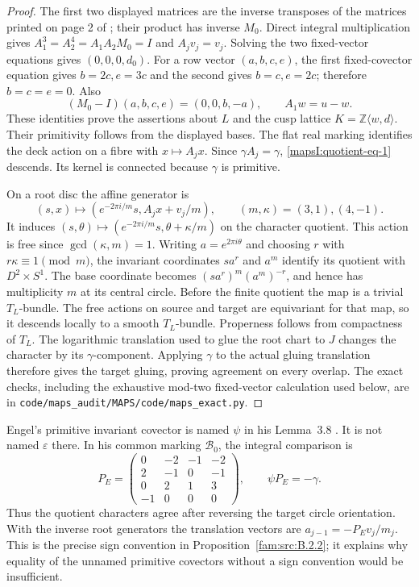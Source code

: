 \begin{proof}
The first two displayed matrices are the inverse transposes of
the matrices printed on page 2 of \cite{AC2026}; their product
has inverse $M_0$.  Direct integral multiplication gives
$A_1^3=A_2^4=A_1A_2M_0=I$ and $A_jv_j=v_j$.
Solving the two fixed-vector equations gives $(0,0,0,d_0)$.
For a row vector $(a,b,c,e)$, the first fixed-covector equation
gives $b=2c,e=3c$ and the second gives $b=c,e=2c$;
therefore $b=c=e=0$.  Also
\[
 (M_0-I)(a,b,c,e)=(0,0,b,-a),\qquad
 A_1w=u-w.
\]
These identities prove the assertions about $L$ and the cusp
lattice $K=\mathbb Z\langle w,d\rangle$.  Their primitivity follows
from the displayed bases.  The flat real marking identifies the
deck action on a fibre with $x\mapsto A_jx$.  Since
$\gamma A_j=\gamma$, \eqref{mapsI:quotient-eq-1} descends.  Its kernel is connected
because $\gamma$ is primitive.

On a root disc the affine generator is
\[
 (s,x)\longmapsto
 (e^{-2\pi i/m}s,A_jx+v_j/m),\qquad (m,\kappa)=(3,1),(4,-1).
\]
It induces $(s,\theta)\mapsto
(e^{-2\pi i/m}s,\theta+\kappa/m)$ on the character quotient.
This action is free since $\gcd(\kappa,m)=1$.  Writing
$a=e^{2\pi i\theta}$ and choosing $r$ with $r\kappa\equiv1\pmod m$,
the invariant coordinates $s a^r$ and $a^m$ identify its quotient
with $D^2\times S^1$.  The base coordinate becomes
$(s a^r)^m(a^m)^{-r}$, and hence has multiplicity $m$ at its
central circle.  Before the finite quotient the map is a trivial
$T_L$-bundle.  The free actions on source and target are
equivariant for that map, so it descends locally to a smooth
$T_L$-bundle.  Properness follows from compactness of $T_L$.
The logarithmic translation used to glue the root chart to $J$
changes the character by its $\gamma$-component.  Applying
$\gamma$ to the actual gluing translation therefore gives the
target gluing, proving agreement on every overlap.
The exact checks, including the exhaustive mod-two fixed-vector
calculation used below, are in \texttt{code/maps\_audit/MAPS/code/maps\_exact.py}.
\end{proof}


Engel's primitive invariant covector is named $\psi$ in his
Lemma~3.8 \cite[Lemma~3.8]{Engel2026}.  It is not named $\varepsilon$ there.  In his
common marking $\mathcal B_0$, the integral comparison is
\[
 P_E=\begin{pmatrix}0&-2&-1&-2\\2&-1&0&-1\\0&2&1&3\\-1&0&0&0\end{pmatrix},
 \qquad \psi P_E=-\gamma.
 \label{mapsI:quotient-eq-2}
\]
Thus the quotient characters agree after reversing the target
circle orientation.  With the inverse root generators the
translation vectors are $a_{j-1}=-P_Ev_j/m_j$.
This is the precise sign convention in Proposition~\ref{fam:src:B.2.2}; it explains why equality of the unnamed primitive
covectors without a sign convention would be insufficient.

